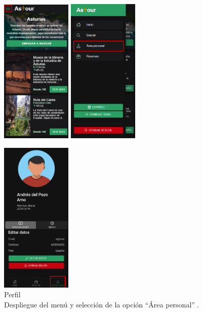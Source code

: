 \begin{figure}[H]
	\centering
	\begin{minipage}{0.45\textwidth}
		\centering
		\includegraphics[width=0.3\textwidth]{7-Construccion/Manuales/mobile/menu marcado.png}
		\includegraphics[width=0.3\textwidth]{7-Construccion/Manuales/mobile/area personal marcado.png}
		\caption{Perfil \\ Despliegue del menú y selección de la opción “Área personal” .}
		\label{fig:areaPersonal-movil}
	\end{minipage}
	\hfill
	\begin{minipage}{0.45\textwidth}
		\centering
		\includegraphics[width=0.3\textwidth]{7-Construccion/Manuales/app/P1-Perfil.png}

\end{minipage}
\end{figure}
